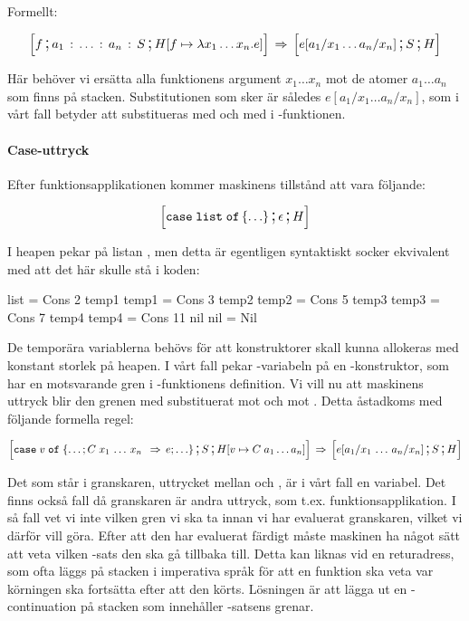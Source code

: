 \documentclass[../Core]{subfiles}
\begin{document}
Formellt:

\[
\text{\large$$}\Big[f \,\text{\Large;}\, a_{1} \,:\, \ldots \,:\, a_{n} \,:\, S \,\text{\Large;}\, H[f\mapsto\lambda x_{1}\ldots x_{n}.e]\Big]\,\Rightarrow\, \text{\large$$}\Big[e[a{}_{1}/x_{1}\ldots a_{n}/x_{n}] \,\text{\Large;}\, S \,\text{\Large;}\, H\Big]
\]


Här behöver vi ersätta alla funktionens argument $x_{1}\ldots x_{n}$ mot
de atomer $a_{1}\ldots a_{n}$ som finns på stacken. Substitutionen som sker är 
således $e[a{}_{1}/x_{1}\ldots a_{n}/x_{n}]$, som i vårt fall betyder att
 substitueras med  och  med  i -funktionen.


\paragraph{Case-uttryck} 
 Efter funktionsapplikationen kommer maskinens tillstånd att vara följande:

\[
\text{\large$$}\Big[\mathtt{case\; list\; of\,\lbrace\ldots\rbrace} \,\text{\Large;}\, \epsilon \,\text{\Large;}\, H\Big]
\]


I heapen pekar  på listan \ic{[2,3,5,7,11]}, men detta är egentligen 
syntaktiskt socker ekvivalent med att det här skulle stå i koden:

\begin{codeEx}
list = Cons 2 temp1
temp1 = Cons 3 temp2
temp2 = Cons 5 temp3
temp3 = Cons 7 temp4
temp4 = Cons 11 nil
nil = Nil
\end{codeEx}

De temporära variablerna behövs för att konstruktorer skall kunna
allokeras med konstant storlek på heapen. I vårt fall pekar
-variabeln på en -konstruktor, som har en motsvarande gren
i -funktionens definition. Vi vill nu att maskinens uttryck
blir den grenen med  substituerat mot  och  mot .
Detta åstadkoms med följande formella regel:

\begin{multline*}
\text{\large$$}\Big[\mathtt{case}\; v\; \mathtt{of}\;\{\ldots;C\; x_{1}\,\ldots\, x_{n}\;\,\Rightarrow\, e;\ldots\} \,\text{\Large;}\, S \,\text{\Large;}\, H[v\mapsto C\; a_{1}\ldots a_{n}]\Big]
\,\Rightarrow\, \text{\large$$}\Big[e[a_{1}/x_{1}\,\ldots\, a_{n}/x_{n}] \,\text{\Large;}\, S \,\text{\Large;}\, H\Big]
\end{multline*}


Det som står i granskaren, uttrycket mellan  och , är i vårt
fall en variabel. Det finns också fall då granskaren är andra uttryck, som
t.ex. funktionsapplikation. I så fall vet vi inte vilken gren vi ska
ta innan vi har evaluerat granskaren, vilket vi därför vill göra.
Efter att den har evaluerat färdigt måste maskinen ha något sätt att
veta vilken -sats den ska gå tillbaka till. Detta kan liknas
vid en returadress, som ofta läggs på stacken i imperativa språk för att
en funktion ska veta var körningen ska fortsätta efter att den körts.
Lösningen är att lägga ut en -continuation på stacken
som innehåller -satsens grenar.
\end{document}
